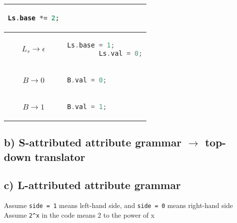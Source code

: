 \documentclass[12pt, A4]{article}
\begin{document}
\begin{tabular}{|c|l|}
\begin{lstlisting}[language=c]
        Ls.base *= 2;
        \end{lstlisting}
        \\ 
        \hline 
        $L_s \rightarrow \epsilon$& 
        \begin{lstlisting}[language=c]
        Ls.base = 1;
        Ls.val = 0;
        \end{lstlisting}
        \\ 
        \hline 
        $B \rightarrow 0$&
        \begin{lstlisting}[language=c]
        B.val = 0;
        \end{lstlisting}
        \\  
        \hline 
        $B \rightarrow 1$&
        \begin{lstlisting}[language=c]
        B.val = 1;
        \end{lstlisting}
        \\ 
        \hline 
    \end{tabular} 
	
    \newpage
	\subsection*{b) S-attributed attribute grammar $\rightarrow$ top-down translator}
	
    \newpage
	\subsection*{c) L-attributed attribute grammar}
    
    Assume \texttt{side = 1} means left-hand side, and \texttt{side = 0} means right-hand side\\
    
    \noindent Assume \texttt{2^x} in the code means 2 to the power of x\\
        
\end{document}
